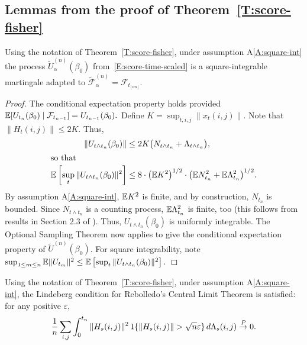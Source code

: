 \documentclass[final]{statsoc}
\begin{document}
\subsection{Lemmas from the proof of Theorem~\ref{T:score-fisher}}

\begin{lemma}\label{L:adapted-martingale}
Using the notation of Theorem~\ref{T:score-fisher}, under assumption
A\ref{A:square-int} the process $\tilde U_\alpha^{(n)}(\beta_0)$
from~\eqref{E:score-time-scaled} is a square-integrable martingale adapted to
\(
    \mathcal{\tilde F}^{(n)}_\alpha
        =
        \mathcal{F}_{t_{\lfloor \alpha n \rfloor}}.
\)
\end{lemma}

\begin{proof}
The conditional expectation property holds provided
\(
    \mathbb{E}[ U_{t_{n}}(\beta_0) \mid \mathcal{F}_{t_{n-1}} ]
        = U_{t_{n-1}}(\beta_0).
\)
Define $K = \sup_{t,i,j} \| x_{t}(i,j) \|$.
Note that $\|H_{t}(i,j)\| \leq 2 K$.  Thus,
\begin{align*}
    \| U_{t \wedge t_n} (\beta_0) \|
        &\leq
            2 K
            \big(
                N_{t \wedge t_n}
                +
                \Lambda_{t \wedge t_n}
            \big), \\
\intertext{so that}
    \mathbb{E} \left[
        \sup_t
        \| U_{t \wedge t_n} (\beta_0) \|^2
    \right]
        &\leq
            8 \cdot \big(\mathbb{E} K^2\big)^{1/2} \cdot
            \big(
              \mathbb{E} N_{t_n}^2
              +
              \mathbb{E} \Lambda_{t_n}^2
            \big)^{1/2}.
\end{align*}
By assumption A\ref{A:square-int}, $\mathbb{E} K^2$ is finite, and by construction,
$N_{t_n}$ is bounded.  Since $N_{t \wedge t_n}$ is a counting process,
$\mathbb{E} \Lambda_{t_n}^2$ is finite, too
(this follows from results in Section 2.3 of
\citet{fleming1991counting}).  Thus, $U_{t \wedge t_n}(\beta_0)$
is uniformly integrable.  The Optional Sampling Theorem now applies to
give the conditional expectation property of $\tilde U^{(n)}(\beta_0)$.  For
square integrability, note
\(
    \sup_{1 \leq m \leq n}
    \mathbb{E} \| U_{t_m} \|^2
        \leq
        \mathbb{E} \left[
           \sup_t
           \| U_{t \wedge t_n} (\beta_0) \|^2
        \right].
\)
\end{proof}

\begin{lemma}\label{L:Lindeberg-condition}
Using the notation of Theorem~\ref{T:score-fisher}, under assumption
A\ref{A:square-int}, the Lindeberg condition for Rebolledo's \citeyearpar{rebolledo1980central} Central Limit
Theorem is satisfied: for any positive $\varepsilon$,
\[
    \frac{1}{n}
    \sum_{i,j}
    \int_{0}^{t_n}
        \| H_s(i,j) \|^2
        \, 1\{\| H_s(i,j) \| > \sqrt{n} \varepsilon \}
        \, d\Lambda_s(i,j)
        \overset{\mathit{P}}{\to}
        0.
\]
\end{lemma}
\end{document}
